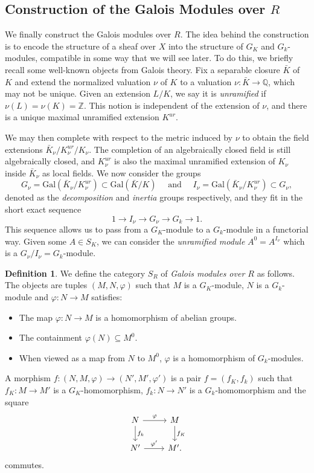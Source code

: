 \documentclass{article}
\newcommand{\Gal}{\mathrm{Gal}}
\newcommand{\QQ}{\mathbb{Q}}
\newcommand{\ZZ}{\mathbb{Z}}
\theoremstyle{plain}
\theoremstyle{definition}
\newtheorem{definition}[theorem]{Definition}
\begin{document}
    \subsection{Construction of the Galois Modules over \texorpdfstring{$R$}{TEXT}}
    We finally construct the Galois modules over $R$. The idea behind the construction is to encode the structure of a sheaf over $X$ into the structure of $G_K$ and $G_k$-modules, compatible in some way that we will see later. To do this, we briefly recall some well-known objects from Galois theory. Fix a separable closure $\bar K$ of $K$ and extend the normalized valuation $\nu$ of $K$ to a valuation $\nu:\bar K\to\QQ$, which may not be unique. Given an extension $L/K$, we say it is \textit{unramified} if $\nu(L)=\nu(K)=\ZZ$. This notion is independent of the extension of $\nu$, and there is a unique maximal unramified extension $K^{ur}$.

    We may then complete with respect to the metric induced by $\nu$ to obtain the field extensions $\bar K_\nu/K^{ur}_\nu/K_\nu$. The completion of an algebraically closed field is still algebraically closed, and $K^{ur}_\nu$ is also the maximal unramified extension of $K_\nu$ inside $\bar K_\nu$ as local fields. We now consider the groups
    $$G_\nu=\Gal(\bar K_\nu/K^{ur}_\nu)\subset\Gal(\bar K/K)\quad\text{ and }\quad I_\nu=\Gal(\bar K_\nu/K^{ur}_\nu)\subset G_\nu,$$
    denoted as the \textit{decomposition} and \textit{inertia} groups respectively, and they fit in the short exact sequence
    $$1\longrightarrow I_\nu\longrightarrow G_\nu\longrightarrow G_k\longrightarrow 1.$$
    This sequence allows us to pass from a $G_K$-module to a $G_k$-module in a functorial way. Given some $A\in S_K$, we can consider the \textit{unramified module} $A^0=A^{I_\nu}$ which is a $G_\nu/I_\nu=G_k$-module.

    \begin{definition}\label{defn:galoismod}
        We define the category $S_R$ of \textit{Galois modules over $R$} as follows. The objects are tuples $(M,N,\varphi)$ such that $M$ is a $G_K$-module, $N$ is a $G_k$-module and $\varphi:N\to M$ satisfies: 
        \begin{itemize}
            \item The map $\varphi:N\to M$ is a homomorphism of abelian groups.
            \item The containment $\varphi(N)\subseteq M^0$.
            \item When viewed as a map from $N$ to $M^{0}$, $\varphi$ is a homomorphism of $G_k$-modules.
        \end{itemize}
        A morphism $f:(N,M,\varphi)\to(N',M',\varphi')$ is a pair $f=(f_K,f_k)$ such that $f_K:M\to M'$ is a $G_K$-homomorphism, $f_k:N\to N'$ is a $G_k$-homomorphism and the square
        \[
            \begin{tikzcd}
                N \arrow[r,"\varphi"] \arrow[d,"f_k"] & M \arrow[d,"f_K"] \\
                N' \arrow[r,"\varphi'"] & M'.
            \end{tikzcd}
        \]
        commutes.
    \end{definition}
\end{document}
